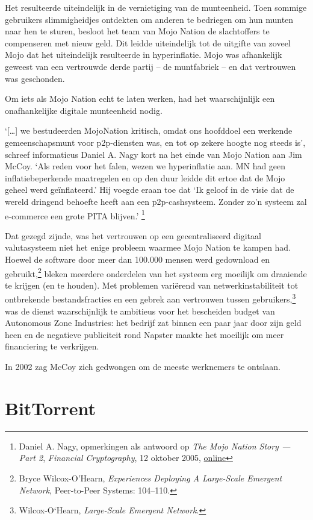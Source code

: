 \documentclass[
  a5paper,
  smalldemyvopaper,11pt,twoside,onecolumn,openright,extrafontsizes,
hidelinks]{memoir}
\begin{document}
Het resulteerde uiteindelijk in de vernietiging van de munteenheid. Toen
sommige gebruikers slimmigheidjes ontdekten om anderen te bedriegen om
hun munten naar hen te sturen, besloot het team van Mojo Nation de
slachtoffers te compenseren met nieuw geld. Dit leidde uiteindelijk tot
de uitgifte van zoveel Mojo dat het uiteindelijk resulteerde in
hyperinflatie. Mojo was afhankelijk geweest van een vertrouwde derde
partij -- de muntfabriek -- en dat vertrouwen was geschonden.

Om iets als Mojo Nation echt te laten werken, had het waarschijnlijk een
onafhankelijke digitale munteenheid nodig.

`{[}\ldots{]} we bestudeerden MojoNation kritisch, omdat ons hoofddoel
een werkende gemeenschapsmunt voor p2p-diensten was, en tot op zekere
hoogte nog steeds is', schreef informaticus Daniel A. Nagy kort na het
einde van Mojo Nation aan Jim McCoy. `Als reden voor het falen, wezen we
hyperinflatie aan. MN had geen inflatiebeperkende maatregelen en op den
duur leidde dit ertoe dat de Mojo geheel werd geïnflateerd.' Hij voegde
eraan toe dat `Ik geloof in de visie dat de wereld dringend behoefte
heeft aan een p2p-cashsysteem. Zonder zo'n systeem zal e-commerce een
grote PITA blijven.' \footnote{Daniel A. Nagy, opmerkingen als antwoord
  op \emph{The Mojo Nation Story --- Part 2}, \emph{Financial
  Cryptography}, 12 oktober 2005,
  \href{https://www.financialcryptography.com/mt/archives/000572.html}{online}}

Dat gezegd zijnde, was het vertrouwen op een gecentraliseerd digitaal
valutasysteem niet het enige probleem waarmee Mojo Nation te kampen had.
Hoewel de software door meer dan 100.000 mensen werd gedownload en
gebruikt,\footnote{Bryce Wilcox-O'Hearn, \emph{Experiences Deploying A
  Large-Scale Emergent Network}, Peer-to-Peer Systems: 104--110.} bleken
meerdere onderdelen van het systeem erg moeilijk om draaiende te krijgen
(en te houden). Met problemen variërend van netwerkinstabiliteit tot
ontbrekende bestandsfracties en een gebrek aan vertrouwen tussen
gebruikers,\footnote{Wilcox-O`Hearn, \emph{Large-Scale Emergent
  Network}.} was de dienst waarschijnlijk te ambitieus voor het
bescheiden budget van Autonomous Zone Industries: het bedrijf zat binnen
een paar jaar door zijn geld heen en de negatieve publiciteit rond
Napster maakte het moeilijk om meer financiering te verkrijgen.

In 2002 zag McCoy zich gedwongen om de meeste werknemers te ontslaan.

\section{BitTorrent}\label{bittorrent}
\end{document}
